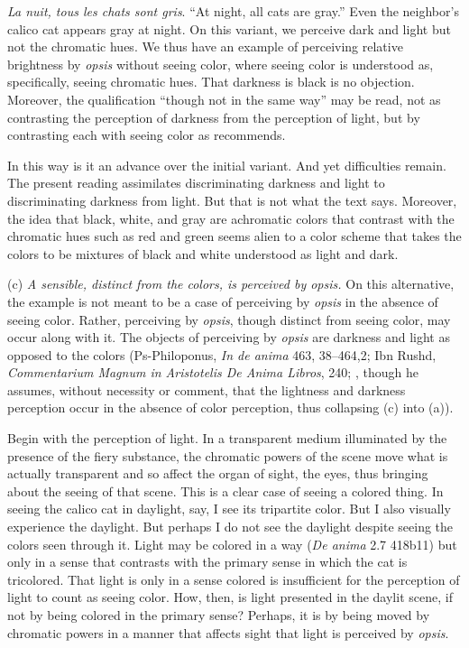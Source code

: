 \emph{La nuit, tous les chats sont gris}. ``At night, all cats are gray.'' Even the neighbor's calico cat appears gray at night. On this variant, we perceive dark and light but not the chromatic hues. We thus have an example of perceiving relative brightness by \emph{opsis} without seeing color, where seeing color is understood as, specifically, seeing chromatic hues. That darkness is black is no objection. Moreover, the qualification ``though not in the same way'' may be read, not as contrasting the perception of darkness from the perception of light, but by contrasting each with seeing color as \citet[275]{Ross:1961uq} recommends.

In this way is it an advance over the initial variant. And yet difficulties remain. The present reading assimilates discriminating darkness and light to discriminating darkness from light. But that is not what the text says. Moreover, the idea that black, white, and gray are achromatic colors that contrast with the chromatic hues such as red and green seems alien to a color scheme that takes the colors to be mixtures of black and white understood as light and dark.

(c) \emph{A sensible, distinct from the colors, is perceived by \emph{opsis}.} On this alternative, the example is not meant to be a case of perceiving by \emph{opsis} in the absence of seeing color. Rather, perceiving by \emph{opsis}, though distinct from seeing color, may occur along with it. The objects of perceiving by \emph{opsis} are darkness and light as opposed to the colors (Ps-Philoponus, \emph{In de anima} 463, 38–464,2; Ibn Rushd, \emph{Commentarium Magnum in Aristotelis De Anima Libros}, 240; \citealt[249–50]{Johansen:2005hz}, though he assumes, without necessity or comment, that the lightness and darkness perception occur in the absence of color perception, thus collapsing (c) into (a)). 

Begin with the perception of light. In a transparent medium illuminated by the presence of the fiery substance, the chromatic powers of the scene move what is actually transparent and so affect the organ of sight, the eyes, thus bringing about the seeing of that scene. This is a clear case of seeing a colored thing. In seeing the calico cat in daylight, say, I see its tripartite color. But I also visually experience the daylight. But perhaps I do not see the daylight despite seeing the colors seen through it. Light may be colored in a way (\emph{De anima} 2.7 418b11) but only in a sense that contrasts with the primary sense in which the cat is tricolored. That light is only in a sense colored is insufficient for the perception of light to count as seeing color. How, then, is light presented in the daylit scene, if not by being colored in the primary sense? Perhaps, it is by being moved by chromatic powers in a manner that affects sight that light is perceived by \emph{opsis}.

